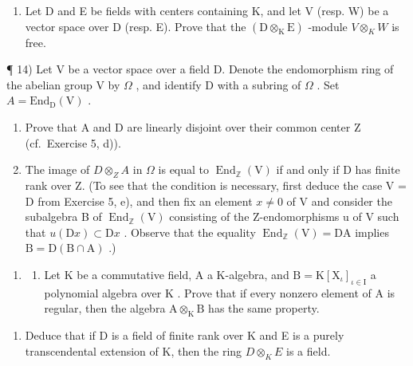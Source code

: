 \begin{enumerate}
\def\labelenumi{\arabic{enumi})}
\setcounter{enumi}{12}
\tightlist
\item
  Let D and E be fields with centers containing K, and let V (resp. W) be a vector space over D (resp. E). Prove that the \((\mathrm{D} \otimes_{\mathrm{K}} \mathrm{E})\) -module \(V \otimes_{K} W\) is free.
\end{enumerate}

¶ 14) Let V be a vector space over a field D. Denote the endomorphism ring of the abelian group V by \(\Omega\) , and identify D with a subring of \(\Omega\) . Set \(A = \text{End}_{\text{D}}(\text{V})\) .

\begin{enumerate}
\def\labelenumi{\alph{enumi})}
\item
  Prove that A and D are linearly disjoint over their common center Z (cf.~Exercise 5, d)).
\item
  The image of \(D \otimes_{Z} A\) in \(\Omega\) is equal to \(\operatorname{End}_{\mathbb{Z}}(\mathrm{V})\) if and only if D has finite rank over Z. (To see that the condition is necessary, first deduce the case V = D from Exercise 5, e), and then fix an element \(x \neq 0\) of V and consider the subalgebra B of \(\operatorname{End}_{\mathbb{Z}}(\mathrm{V})\) consisting of the Z-endomorphisms u of V such that \(u(\mathrm{D}x) \subset \mathrm{D}x\) . Observe that the equality \(\operatorname{End}_{\mathbb{Z}}(\mathrm{V}) = \mathrm{DA}\) implies \(\mathrm{B} = \mathrm{D}(\mathrm{B} \cap \mathrm{A})\) .)
\end{enumerate}

\begin{enumerate}
\def\labelenumi{\arabic{enumi})}
\setcounter{enumi}{14}
\tightlist
\item
  \begin{enumerate}
  \def\labelenumii{\alph{enumii})}
  \tightlist
  \item
    Let \(\mathrm{K}\) be a commutative field, A a K-algebra, and \(\mathrm{B} = \mathrm{K}[\mathrm{X}_{\iota}]_{\iota \in \mathrm{I}}\) a polynomial algebra over \(\mathrm{K}\) . Prove that if every nonzero element of \(\mathrm{A}\) is regular, then the algebra \(\mathrm{A} \otimes_{\mathrm{K}} \mathrm{B}\) has the same property.
  \end{enumerate}
\end{enumerate}

\begin{enumerate}
\def\labelenumi{\alph{enumi})}
\setcounter{enumi}{1}
\tightlist
\item
  Deduce that if D is a field of finite rank over K and E is a purely transcendental extension of K, then the ring \(D \otimes_{K} E\) is a field.
\end{enumerate}

